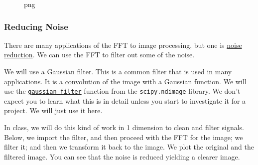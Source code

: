 \begin{figure}
\centering
{}
\caption{png}
\end{figure}

\subsubsection{Reducing Noise}\label{reducing-noise}

There are many applications of the FFT to image processing, but one is
\href{https://en.wikipedia.org/wiki/Noise_reduction}{noise reduction}.
We can use the FFT to filter out some of the noise.

We will use a Gaussian filter. This is a common filter that is used in
many applications. It is a
\href{https://en.wikipedia.org/wiki/Convolution}{convolution} of the
image with a Gaussian function. We will use the
\href{https://docs.scipy.org/doc/scipy/reference/generated/scipy.ndimage.gaussian_filter.html}{\texttt{gaussian\_filter}}
function from the \texttt{scipy.ndimage} library. We don't expect you to
learn what this is in detail unless you start to investigate it for a
project. We will just use it here.

In class, we will do this kind of work in 1 dimension to clean and
filter signals. Below, we import the filter, and then proceed with the
FFT for the image; we filter it; and then we transform it back to the
image. We plot the original and the filtered image. You can see that the
noise is reduced yielding a clearer image.


